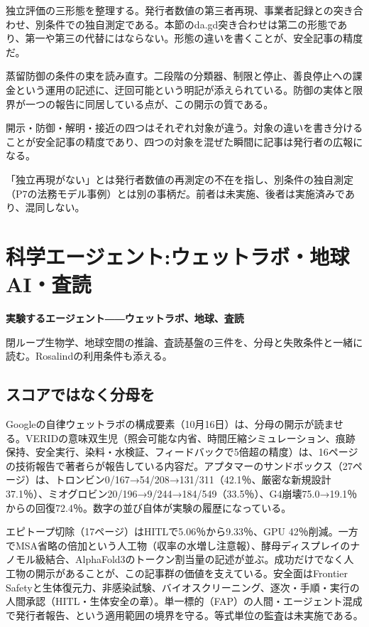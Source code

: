 \documentclass[lualatex,a4paper,10pt]{jlreq}
\begin{document}
独立評価の三形態を整理する。発行者数値の第三者再現、事業者記録との突き合わせ、別条件での独自測定である。本節のda.gd突き合わせは第二の形態であり、第一や第三の代替にはならない。形態の違いを書くことが、安全記事の精度だ。
\cite{B40,B79}


蒸留防御の条件の束を読み直す。二段階の分類器、制限と停止、善良停止への課金という運用の記述に、迂回可能という明記が添えられている。防御の実体と限界が一つの報告に同居している点が、この開示の質である。
\cite{B41,B80}


開示・防御・解明・接近の四つはそれぞれ対象が違う。対象の違いを書き分けることが安全記事の精度であり、四つの対象を混ぜた瞬間に記事は発行者の広報になる。
\cite{B40,B79,B41,B80,B42,B81,B39,B82}


「独立再現がない」とは発行者数値の再測定の不在を指し、別条件の独自測定（P7の法務モデル事例）とは別の事柄だ。前者は未実施、後者は実施済みであり、混同しない。


\section{科学エージェント:ウェットラボ・地球AI・査読}
\label{sec:P6}

{\Large\bfseries 実験するエージェント――ウェットラボ、地球、査読\par}
\smallskip
{\color{SurveyMuted}閉ループ生物学、地球空間の推論、査読基盤の三件を、分母と失敗条件と一緒に読む。Rosalindの利用条件も添える。\par}
\bigskip

\subsection*{スコアではなく分母を}

Googleの自律ウェットラボの構成要素（10月16日）は、分母の開示が読ませる。VERIDの意味双生児（照会可能な内省、時間圧縮シミュレーション、痕跡保持、安全実行、染料・水検証、フィードバックで5倍超の精度）は、16ページの技術報告で著者らが報告している内容だ。アプタマーのサンドボックス（27ページ）は、トロンビン0/167→54/208→131/311（42.1％、厳密な新規設計37.1％）、ミオグロビン20/196→9/244→184/549（33.5％）、G4崩壊75.0→19.1％からの回復72.4％。数字の並び自体が実験の履歴になっている。
\cite{B46,B83,B44,B43,B45}


エピトープ切除（17ページ）はHITLで5.06％から9.33％、GPU 42％削減。一方でMSA省略の倍加という人工物（収率の水増し注意報）、酵母ディスプレイのナノモル級結合、AlphaFold3のトークン割当量の記述が並ぶ。成功だけでなく人工物の開示があることが、この記事群の価値を支えている。安全面はFrontier Safetyと生体復元力、非感染試験、バイオスクリーニング、逐次・手順・実行の人間承認（HITL・生体安全の章）。単一標的（FAP）の人間・エージェント混成で発行者報告、という適用範囲の境界を守る。等式単位の監査は未実施である。
\cite{B46,B83,B44,B43,B45}
\end{document}
